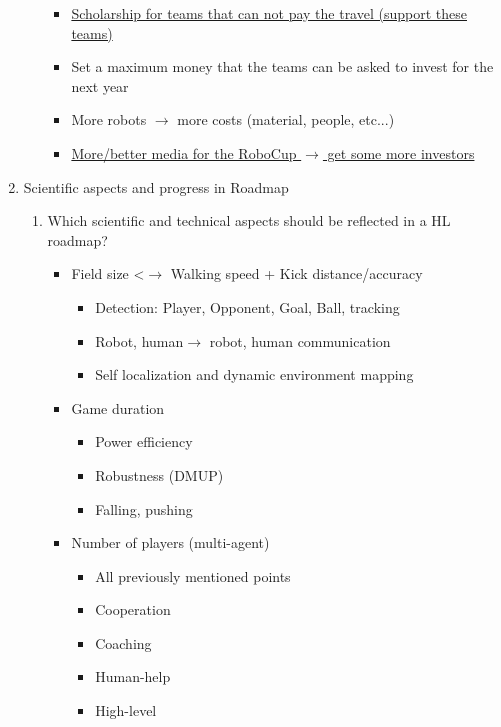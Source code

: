 \documentclass{article}
\begin{document}
\begin{enumerate}
\begin{enumerate}
\begin{itemize}
           \item \underline{Scholarship for teams that can not pay the travel (support these teams)}
           \item Set a maximum money that the teams can be asked to invest for the next year
           \item More robots $\rightarrow$ more costs (material, people, etc...)
           \item \underline{More/better media for the RoboCup $\rightarrow$ get some more investors}
\end{itemize}
\end{enumerate}
   \item Scientific aspects and progress in Roadmap
   \begin{enumerate} 
       \item Which scientific and technical aspects should be reflected in a HL roadmap?
       \begin{itemize} 
           \item Field size <$\rightarrow$ Walking speed + Kick distance/accuracy
           \begin{itemize} 
               \item Detection: Player, Opponent, Goal, Ball, tracking
               \item Robot, human$\rightarrow$ robot, human communication
               \item Self localization and dynamic environment mapping
       \end{itemize}
           \item Game duration
           \begin{itemize} 
               \item Power efficiency
               \item Robustness (DMUP)
               \item Falling, pushing
       \end{itemize}
           \item Number of players (multi-agent)
           \begin{itemize} 
               \item All previously mentioned points
               \item Cooperation
               \item Coaching
               \item Human-help
               \item High-level
   \end{itemize}

\end{itemize}
\end{enumerate}
\end{enumerate}
\end{document}
